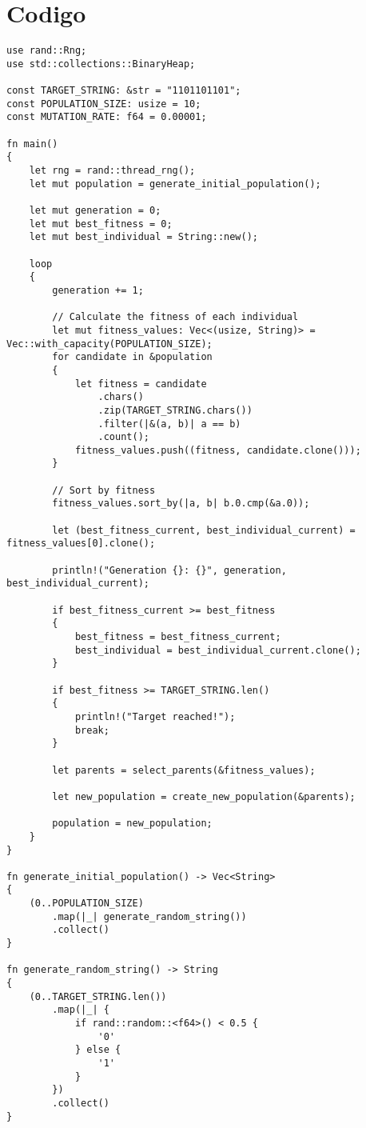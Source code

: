 \documentclass{article}
\begin{document}
\section{Codigo}
\begin{verbatim}
use rand::Rng;
use std::collections::BinaryHeap;

const TARGET_STRING: &str = "1101101101";
const POPULATION_SIZE: usize = 10;
const MUTATION_RATE: f64 = 0.00001;

fn main()
{
    let rng = rand::thread_rng();
    let mut population = generate_initial_population();

    let mut generation = 0;
    let mut best_fitness = 0;
    let mut best_individual = String::new();

    loop
    {
        generation += 1;

        // Calculate the fitness of each individual
        let mut fitness_values: Vec<(usize, String)> = Vec::with_capacity(POPULATION_SIZE);
        for candidate in &population
        {
            let fitness = candidate
                .chars()
                .zip(TARGET_STRING.chars())
                .filter(|&(a, b)| a == b)
                .count();
            fitness_values.push((fitness, candidate.clone()));
        }

        // Sort by fitness
        fitness_values.sort_by(|a, b| b.0.cmp(&a.0));

        let (best_fitness_current, best_individual_current) = fitness_values[0].clone();

        println!("Generation {}: {}", generation, best_individual_current);

        if best_fitness_current >= best_fitness
        {
            best_fitness = best_fitness_current;
            best_individual = best_individual_current.clone();
        }

        if best_fitness >= TARGET_STRING.len()
        {
            println!("Target reached!");
            break;
        }

        let parents = select_parents(&fitness_values);

        let new_population = create_new_population(&parents);

        population = new_population;
    }
}

fn generate_initial_population() -> Vec<String>
{
    (0..POPULATION_SIZE)
        .map(|_| generate_random_string())
        .collect()
}

fn generate_random_string() -> String
{
    (0..TARGET_STRING.len())
        .map(|_| {
            if rand::random::<f64>() < 0.5 {
                '0'
            } else {
                '1'
            }
        })
        .collect()
}


\end{verbatim}
\end{document}
